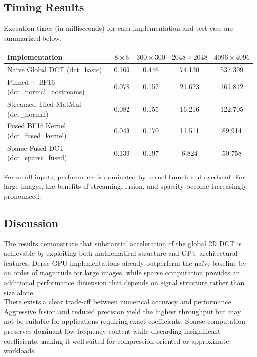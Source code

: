 \documentclass{article}
\begin{document}

\subsection{Timing Results}

Execution times (in milliseconds) for each implementation and test case are summarized below.

\begin{center}
\begin{tabular}{lcccc}
\toprule
Implementation & $8\times8$ & $300\times300$ & $2048\times2048$ & $4096\times4096$ \\
\midrule
Naïve Global DCT (dct\_basic) & 0.160 & 0.446 & 74.130 & 537.309 \\
Pinned + BF16 (dct\_normal\_nostreams) & 0.078 & 0.152 & 21.623 & 161.812 \\
Streamed Tiled MatMul (dct\_normal) & 0.082 & 0.155 & 16.216 & 122.705 \\
Fused BF16 Kernel (dct\_fused\_kernel) & 0.049 & 0.170 & 11.511 & 89.914 \\
Sparse Fused DCT (dct\_sparse\_fused) & 0.130 & 0.197 & 6.824 & 50.758 \\
\bottomrule
\end{tabular}
\end{center}

For small inputs, performance is dominated by kernel launch and overhead. For large images, the benefits of streaming, fusion, and sparsity become increasingly pronounced.

\subsection{Discussion}

The results demonstrate that substantial acceleration of the global 2D DCT is achievable by exploiting both mathematical structure and GPU architectural features. Dense GPU implementations already outperform the naïve baseline by an order of magnitude for large images, while sparse computation provides an additional performance dimension that depends on signal structure rather than size alone.\\

\noindent There exists a clear trade-off between numerical accuracy and performance. Aggressive fusion and reduced precision yield the highest throughput but may not be suitable for applications requiring exact coefficients. Sparse computation preserves dominant low-frequency content while discarding insignificant coefficients, making it well suited for compression-oriented or approximate workloads. \\
\end{document}

